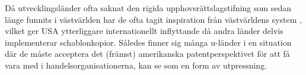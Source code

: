 Då utvecklingsländer ofta saknat den rigida upphovsrättslagstifning som sedan länge funnits i västvärlden har de ofta tagit inspiration från västvärldens system \cite{finger}, vilket ger USA ytterliggare internationellt inflyttande då andra länder delvis implementerar schablonkopior. Således finner sig många u-länder i en situation där de måste acceptera det (främst) amerikanska patentperspektivet för att få vara med i handelsorganisationerna, kan se som en form av utpressning.

